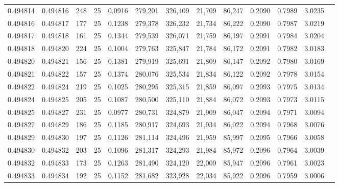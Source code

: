 \begin{tabular}{rrrrrrrrrrrrr}
0.494814 & 0.494816 &   248 &  25 &                                     0.0916 & 279,201 & 326,409 &  21,709 &  86,247 & 0.2090 & 0.7989 & 3.0235 \\
0.494816 & 0.494817 &   177 &  25 &                                     0.1238 & 279,378 & 326,232 &  21,734 &  86,222 & 0.2090 & 0.7987 & 3.0219 \\
0.494817 & 0.494818 &   161 &  25 &                                     0.1344 & 279,539 & 326,071 &  21,759 &  86,197 & 0.2091 & 0.7984 & 3.0204 \\
0.494818 & 0.494820 &   224 &  25 &                                     0.1004 & 279,763 & 325,847 &  21,784 &  86,172 & 0.2091 & 0.7982 & 3.0183 \\
0.494820 & 0.494821 &   156 &  25 &                                     0.1381 & 279,919 & 325,691 &  21,809 &  86,147 & 0.2092 & 0.7980 & 3.0169 \\
0.494821 & 0.494822 &   157 &  25 &                                     0.1374 & 280,076 & 325,534 &  21,834 &  86,122 & 0.2092 & 0.7978 & 3.0154 \\
0.494822 & 0.494824 &   219 &  25 &                                     0.1025 & 280,295 & 325,315 &  21,859 &  86,097 & 0.2093 & 0.7975 & 3.0134 \\
0.494824 & 0.494825 &   205 &  25 &                                     0.1087 & 280,500 & 325,110 &  21,884 &  86,072 & 0.2093 & 0.7973 & 3.0115 \\
0.494825 & 0.494827 &   231 &  25 &                                     0.0977 & 280,731 & 324,879 &  21,909 &  86,047 & 0.2094 & 0.7971 & 3.0094 \\
0.494827 & 0.494829 &   186 &  25 &                                     0.1185 & 280,917 & 324,693 &  21,934 &  86,022 & 0.2094 & 0.7968 & 3.0076 \\
0.494829 & 0.494830 &   197 &  25 &                                     0.1126 & 281,114 & 324,496 &  21,959 &  85,997 & 0.2095 & 0.7966 & 3.0058 \\
0.494830 & 0.494832 &   203 &  25 &                                     0.1096 & 281,317 & 324,293 &  21,984 &  85,972 & 0.2096 & 0.7964 & 3.0039 \\
0.494832 & 0.494833 &   173 &  25 &                                     0.1263 & 281,490 & 324,120 &  22,009 &  85,947 & 0.2096 & 0.7961 & 3.0023 \\
0.494833 & 0.494834 &   192 &  25 &                                     0.1152 & 281,682 & 323,928 &  22,034 &  85,922 & 0.2096 & 0.7959 & 3.0006 \\

\end{tabular}

